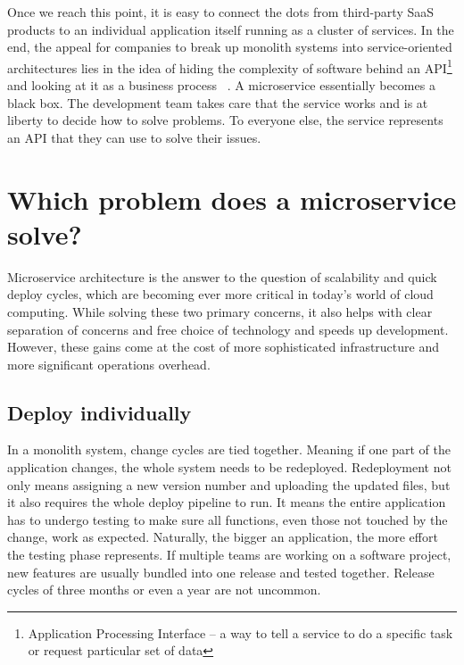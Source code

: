 Once we reach this point, it is easy to connect the dots from third-party SaaS products to an individual application itself running as a cluster of services. In the end, the appeal for companies to break up monolith systems into service-oriented architectures lies in the idea of hiding the complexity of software behind an API\footnote{Application Processing Interface – a way to tell a service to do a specific task or request particular set of data} and looking at it as a business process ~\cite[p.~359]{melzer.2010}. A microservice essentially becomes a black box. The development team takes care that the service works and is at liberty to decide how to solve problems. To everyone else, the service represents an API that they can use to solve their issues.



\section{Which problem does a microservice solve?}
\label{sec:theory:what-problem}

Microservice architecture is the answer to the question of scalability and quick deploy cycles, which are becoming ever more critical in today's world of cloud computing. While solving these two primary concerns, it also helps with clear separation of concerns and free choice of technology and speeds up development. However, these gains come at the cost of more sophisticated infrastructure and more significant operations overhead.

\subsection{Deploy individually}

In a monolith system, change cycles are tied together. Meaning if one part of the application changes, the whole system needs to be redeployed. Redeployment not only means assigning a new version number and uploading the updated files, but it also requires the whole deploy pipeline to run. It means the entire application has to undergo testing to make sure all functions, even those not touched by the change, work as expected. Naturally, the bigger an application, the more effort the testing phase represents. If multiple teams are working on a software project, new features are usually bundled into one release and tested together. Release cycles of three months or even a year are not uncommon.

